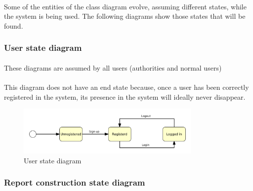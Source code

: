 				\paragraph{}
					Some of the entities of the class diagram evolve, assuming different states, while the system is being used. The following diagrams show those states that will be found.
				\subsubsection{User state diagram}
					\paragraph{}
						These diagrams are assumed by all users (authorities and normal users)
					\paragraph{}
						This diagram does not have an end state because, once a user has been correctly registered in the system, its presence in the system will ideally never disappear.
						\begin{figure}[htbp]
  							\includegraphics[width=0.8\textwidth]{images/StateDiagram/UserStateDiagram.pdf}
  							\centering
  							\caption{User state diagram}
						\end{figure}
				
				\subsubsection{Report construction state diagram}
